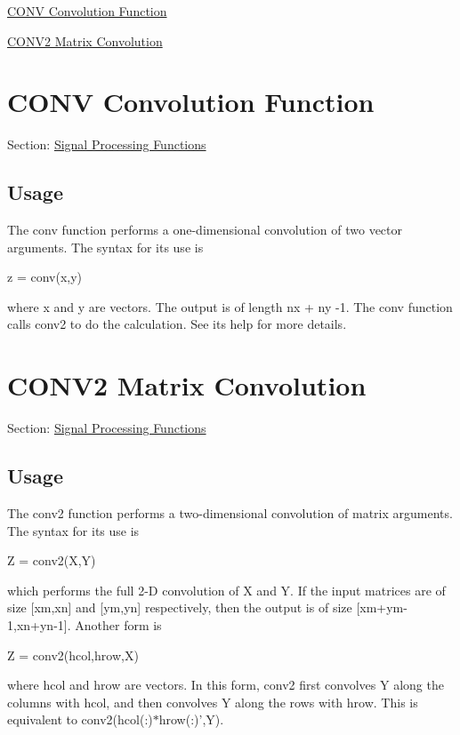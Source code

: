 
\begin{DoxyItemize}
\item \hyperlink{signal_conv}{C\-O\-N\-V Convolution Function}  
\item \hyperlink{signal_conv2}{C\-O\-N\-V2 Matrix Convolution}  
\end{DoxyItemize}\hypertarget{signal_conv}{}\section{C\-O\-N\-V Convolution Function}\label{signal_conv}
Section\-: \hyperlink{sec_signal}{Signal Processing Functions} \hypertarget{vtkwidgets_vtkxyplotwidget_Usage}{}\subsection{Usage}\label{vtkwidgets_vtkxyplotwidget_Usage}
The {\ttfamily conv} function performs a one-\/dimensional convolution of two vector arguments. The syntax for its use is \begin{DoxyVerb}     z = conv(x,y)
\end{DoxyVerb}
 where {\ttfamily x} and {\ttfamily y} are vectors. The output is of length {\ttfamily nx + ny -\/1}. The {\ttfamily conv} function calls {\ttfamily conv2} to do the calculation. See its help for more details. \hypertarget{signal_conv2}{}\section{C\-O\-N\-V2 Matrix Convolution}\label{signal_conv2}
Section\-: \hyperlink{sec_signal}{Signal Processing Functions} \hypertarget{vtkwidgets_vtkxyplotwidget_Usage}{}\subsection{Usage}\label{vtkwidgets_vtkxyplotwidget_Usage}
The {\ttfamily conv2} function performs a two-\/dimensional convolution of matrix arguments. The syntax for its use is \begin{DoxyVerb}    Z = conv2(X,Y)
\end{DoxyVerb}
 which performs the full 2-\/\-D convolution of {\ttfamily X} and {\ttfamily Y}. If the input matrices are of size {\ttfamily \mbox{[}xm,xn\mbox{]}} and {\ttfamily \mbox{[}ym,yn\mbox{]}} respectively, then the output is of size {\ttfamily \mbox{[}xm+ym-\/1,xn+yn-\/1\mbox{]}}. Another form is \begin{DoxyVerb}    Z = conv2(hcol,hrow,X)
\end{DoxyVerb}
 where {\ttfamily hcol} and {\ttfamily hrow} are vectors. In this form, {\ttfamily conv2} first convolves {\ttfamily Y} along the columns with {\ttfamily hcol}, and then convolves {\ttfamily Y} along the rows with {\ttfamily hrow}. This is equivalent to {\ttfamily conv2(hcol(\-:)$\ast$hrow(\-:)',Y)}.

